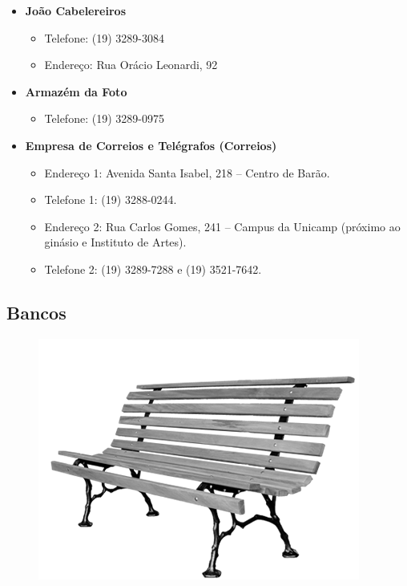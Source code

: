 \begin{itemize}
\item  \textbf{João Cabelereiros}
\begin{itemize}
\item  Telefone: (19) 3289-3084
\item  Endereço: Rua Orácio Leonardi, 92
\end{itemize}

\item  \textbf{Armazém da Foto}
\begin{itemize}
\item  Telefone: (19) 3289-0975
\end{itemize}

\item  \textbf{Empresa de Correios e Telégrafos (Correios)}
\begin{itemize}
\item  Endereço 1: Avenida Santa Isabel, 218 -- Centro de Barão.
\item  Telefone 1: (19) 3288-0244.
\item  Endereço 2: Rua Carlos Gomes, 241 -- Campus da Unicamp (próximo ao
       ginásio e Instituto de Artes).
\item  Telefone 2: (19) 3289-7288 e (19) 3521-7642.
\end{itemize}
\end{itemize}

\subsection{Bancos}

\begin{figure}[h!]
    \centering
    \includegraphics[scale=2.28,keepaspectratio=true]{img/imgs/9-outras_necessidades/raizmadeira.png}
\end{figure}

